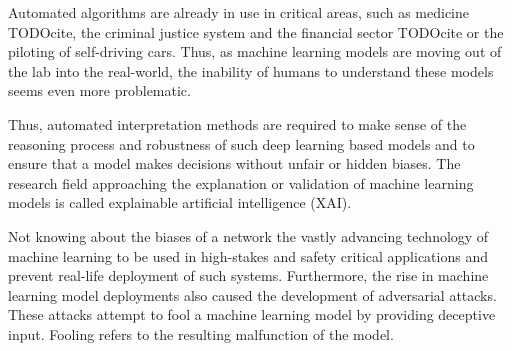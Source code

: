 Automated algorithms are already in use in critical areas, such as medicine TODOcite, the criminal justice system \cite{chouldechova2017fair} and the financial sector TODOcite or the piloting of self-driving cars.
Thus, as machine learning models are moving out of the lab into the real-world, the inability of humans to understand these models seems even more problematic. 

Thus, automated interpretation methods are required to make sense of the reasoning process and robustness of such deep learning based models and to ensure that a model makes decisions without unfair or hidden biases. 
The research field approaching the explanation or validation of machine learning models is called explainable artificial intelligence (XAI).


Not knowing about the biases of a network the vastly advancing technology of machine learning to be used in high-stakes and safety critical applications and prevent real-life deployment of such systems. 
Furthermore, the rise in machine learning model deployments also caused the development of adversarial attacks. These attacks attempt to fool a machine learning model by providing deceptive input. Fooling refers to the resulting malfunction of the model. 



















